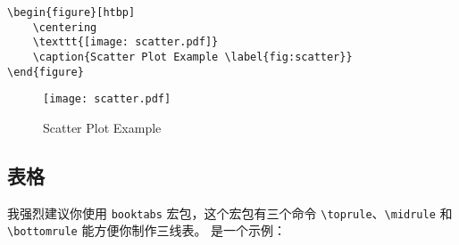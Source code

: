 \documentclass[lang=cn,11pt]{elegantpaper}
\begin{document}
\begin{lstlisting}
\begin{figure}[htbp]
	\centering
	\texttt{[image: scatter.pdf]}
	\caption{Scatter Plot Example \label{fig:scatter}}
\end{figure}
\end{lstlisting}
\begin{figure}[htbp]
	\centering
	\texttt{[image: scatter.pdf]}
	\caption{Scatter Plot Example \label{fig:scatter}}
\end{figure}

\subsection{表格}
我强烈建议你使用 \lstinline{booktabs} 宏包，这个宏包有三个命令 \lstinline{\toprule}、\lstinline{\midrule} 和 \lstinline{\bottomrule} 能方便你制作三线表。 是一个示例：
\end{document}
